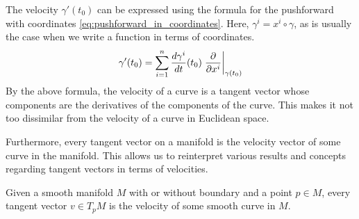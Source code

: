 \documentclass[a4paper,12pt]{article}
\begin{document}
The velocity $\gamma'(t_0)$ can be expressed using the formula for the pushforward with coordinates \eqref{eq:pushforward_in_coordinates}.
Here, $\gamma^i = x^i \circ \gamma$, as is usually the case when we write a function in terms of coordinates.
\begin{equation}
    \gamma'(t_0) = \sum_{i=1}^n \frac{d\gamma^i}{dt}(t_0) \eval{\frac{\partial}{\partial x^i}}{\gamma(t_0)}
\end{equation}
By the above formula, the velocity of a curve is a tangent vector whose components are the derivatives of the components of the curve.
This makes it not too dissimilar from the velocity of a curve in Euclidean space.

Furthermore, every tangent vector on a manifold is the velocity vector of some curve in the manifold.
This allows us to reinterpret various results and concepts regarding tangent vectors in terms of velocities.
\begin{proposition}\label{prop:tangent_vectors_are_velocities_of_curves}
    Given a smooth manifold $M$ with or without boundary and a point $p \in M$, every tangent vector $v \in T_p M$ is the velocity of some smooth curve in $M$.
\end{proposition}
\end{document}
